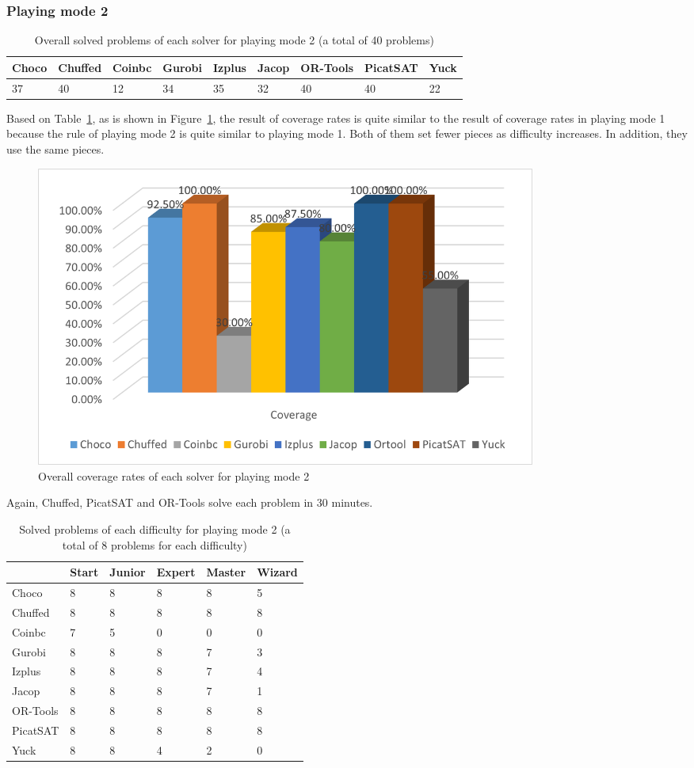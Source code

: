 \subsubsection{Playing mode 2}
\begin{table}[H]
\centering
\caption{Overall solved problems of each solver for playing mode 2 (a total of 40 problems)}
\label{tab:solvedproblem2}
\begin{tabular}{|l|l|l|l|l|l|l|l|l|}
\hline
Choco & Chuffed & Coinbc& Gurobi & Izplus&Jacop& OR-Tools& PicatSAT&Yuck \\
\hline
37   &40      & 12    & 34    &35     &32   &40    &40      &22\\
\hline
\end{tabular}
\end{table}
Based on Table~\ref{tab:solvedproblem2}, as is shown in Figure~\ref{fig:mode2eva2}, the result of coverage rates is quite similar to the result of coverage rates in playing mode 1 because the rule of playing mode 2 is quite similar to playing mode 1. Both of them set fewer pieces as difficulty increases. In addition, they use the same pieces.
\begin{figure}[H]
     \centering
    \includegraphics[width=0.8\textwidth]{figs/mode2coverage.png}
    \caption{Overall coverage rates of each solver for playing mode 2}
    \label{fig:mode2eva2}
\end{figure}
Again, Chuffed, PicatSAT and OR-Tools solve each problem in 30 minutes. 
\begin{table}[H]
\centering
\caption{Solved problems of each difficulty for playing mode 2 (a total of 8 problems for each difficulty)}
\label{tab:solvedproblemforeach difficulty2}
\begin{tabular}{|l|l|l|l|l|l|}
\hline
	    &Start	&Junior	&Expert	&Master	&Wizard\\
\hline
Choco	&8	&8	&8	&8	&5\\
\hline
Chuffed	&8	&8	&8	&8	&8\\
\hline
Coinbc	&7	&5	&0	&0	&0\\
\hline
Gurobi	&8	&8	&8	&7	&3\\
\hline
Izplus	&8	&8	&8	&7	&4\\
\hline
Jacop	&8	&8	&8	&7	&1\\
\hline
OR-Tools	&8	&8	&8	&8	&8\\
\hline
PicatSAT	&8	&8	&8	&8	&8\\
\hline
Yuck	&8	&8	&4	&2	&0\\
\hline
\end{tabular}
\end{table}
